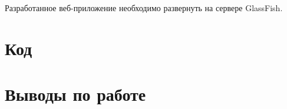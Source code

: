 \documentclass[a4paper, 12pt]{article}
\begin{document}
Разработанное веб-приложение необходимо развернуть на сервере GlassFish.


\section{Код}






\section{Выводы по работе}

\end{document}
